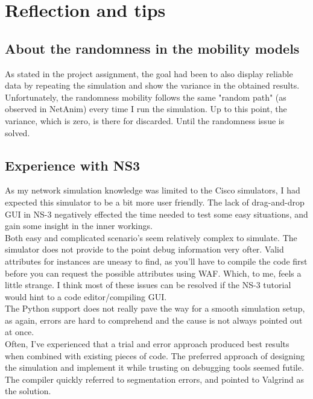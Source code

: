 \chapter{Reflection and tips} 

\section{About the randomness in the mobility models}
As stated in the project assignment, the goal had been to also display reliable data by repeating the simulation and show the variance in the obtained results. Unfortunately, the randomness mobility follows the same "random path" (as observed in NetAnim) every time I run the simulation. Up to this point, the variance, which is zero, is there for
discarded. Until the randomness issue is solved.\\
 
\section{Experience with NS3}
As my network simulation knowledge was limited to the Cisco simulators, I had expected this simulator to be a bit more user friendly. The lack of drag-and-drop GUI in NS-3 negatively effected the time needed to test some easy situations, and gain some insight in the inner workings.\\ 

Both easy and complicated scenario's seem relatively complex to simulate. The simulator does not provide to the point debug information very ofter. Valid attributes for instances are uneasy to find, as you'll have to compile the code first before you can request the possible attributes using WAF. Which, to me, feels a little strange. I think most of these issues can be resolved if the NS-3 tutorial would hint to a code editor/compiling GUI.\\

The Python support does not really pave the way for a smooth simulation setup, as again, errors are hard to comprehend and the cause is not always pointed out at once.\\

Often, I've experienced that a trial and error approach produced best results when combined with existing pieces of code. The preferred approach of designing the simulation and implement it while trusting on debugging tools seemed futile. The compiler quickly referred to segmentation errors, and pointed to Valgrind as the solution. 


